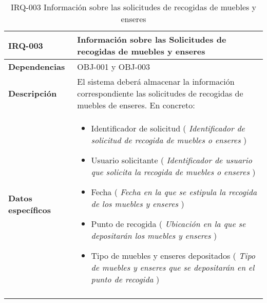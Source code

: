\begin{center}
\begin{longtable}{|p{80pt}|p{9cm}|}
\hline
\textbf{IRQ-003} & Información sobre las  Solicitudes de recogidas de muebles y enseres \\ \hline
\textbf{Dependencias} & OBJ-001 y OBJ-003 \\ \hline
\textbf{Descripción} & El sistema deberá almacenar la información correspondiente las solicitudes de recogidas de muebles de enseres. En concreto: \\ \hline
\textbf{Datos \mbox{específicos}} & 
\begin{itemize}
    \item Identificador de solicitud ( \textit{Identificador de solicitud de recogida de muebles o enseres} )
    \item Usuario solicitante ( \textit{Identificador de usuario que solicita la recogida de muebles o enseres} )
    \item Fecha ( \textit{Fecha en la que se estipula la recogida de los muebles y enseres} )
    \item Punto de recogida ( \textit{Ubicación en la que se depositarán los muebles y enseres} )
    \item Tipo de muebles y enseres depositados ( \textit{Tipo de muebles y enseres que se depositarán en el punto de recogida} )
\end{itemize}\\ \hline
\caption{IRQ-003 Información sobre las solicitudes de recogidas de muebles y enseres}
\end{longtable}
\end{center}
